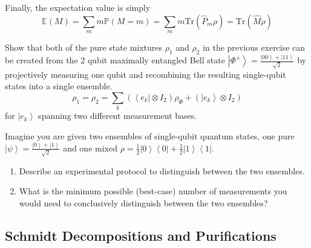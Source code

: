 \documentclass{article}
\newcommand{\ket}[1]{\ensuremath{\left|#1\right\rangle}}
\newcommand{\bra}[1]{\ensuremath{\left\langle#1\right|}}
\newcounter{exercise}[section]
\begin{document}
    \begin{lemma}
      \label{thm:expectation-of-measurements-on-density-operators}
      Finally, the expectation value is simply 
      \begin{equation}
        \mathbb{E}(M) = \sum_m m \mathbb{P}(M = m) = \sum_m m \mathrm{Tr}(\hat{P}_m \rho) = \mathrm{Tr}(\hat{M} \rho)
      \end{equation}
    \end{lemma}

    \begin{exercise}
      Show that both of the pure state mixtures $\rho_1$ and $\rho_2$ in the previous exercise can be created from the 2 qubit maximally entangled Bell state $\ket{\Phi^+} = \frac{\ket{00} + \ket{11}}{\sqrt{2}}$ by projectively measuring one qubit and recombining the resulting single-qubit states into a single ensemble. 
      \begin{equation}
        \rho_1 = \rho_2 = \sum_k ( \bra{e_k} \otimes I_2) \rho_{\Phi} + (\ket{e_k} \otimes I_2)
      \end{equation}
      for $\ket{e_k}$ spanning two different measurement bases. 
    \end{exercise}

    \begin{exercise}
      Imagine you are given two ensembles of single-qubit quantum states, one pure $\ket{\psi} = \frac{\ket{0} + \ket{1}}{\sqrt{2}}$ and one mixed $\rho = \frac{1}{2} \ket{0} \bra{0} + \frac{1}{2} \ket{1} \bra{1}$. 
      \begin{enumerate}
        \item Describe an experimental protocol to distinguish between the two ensembles. 
        \item What is the minimum possible (best-case) number of measurements you would need to conclusively distinguish between the two ensembles? 
      \end{enumerate}
    \end{exercise}

  \subsection{Schmidt Decompositions and Purifications}
\end{document}
